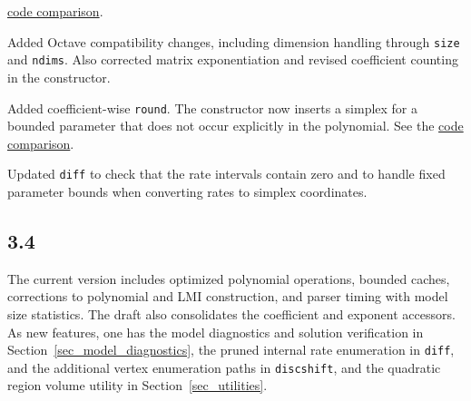 \documentclass[english,11pt]{article}
\theoremstyle{break} \theorembodyfont{\small\rm}
\begin{document}
\begin{description}
  \href{https://github.com/rolmip/rolmip/compare/3.0a...3.0}{code comparison}.
\item[\href{https://github.com/rolmip/rolmip/releases/tag/3.1}{3.1}]
  Added Octave compatibility changes, including dimension handling
  through \texttt{size} and \texttt{ndims}. Also corrected matrix
  exponentiation and revised coefficient counting in the constructor.
\item[\href{https://github.com/rolmip/rolmip/releases/tag/3.2}{3.2}]
  Added coefficient-wise \texttt{round}. The constructor now inserts a
  simplex for a bounded parameter that does not occur explicitly in the
  polynomial. See the
  \href{https://github.com/rolmip/rolmip/compare/3.1...3.2}{code comparison}.
\item[\href{https://github.com/rolmip/rolmip/releases/tag/3.3}{3.3}]
  Updated \texttt{diff} to check that the rate intervals contain zero
  and to handle fixed parameter bounds when converting rates to simplex
  coordinates.
\end{description}

\subsection*{3.4}

The current version includes optimized polynomial operations, bounded caches, corrections
to polynomial and LMI construction, and parser timing with model size
statistics. The draft also consolidates the coefficient and exponent
accessors. As new features, one has the model diagnostics and solution verification in
Section~\ref{sec_model_diagnostics}, the pruned internal rate enumeration
in \texttt{diff}, and the additional vertex enumeration paths in
\texttt{discshift}, and the quadratic region volume utility in
Section~\ref{sec_utilities}.


\clearpage
%


%
\end{document}
